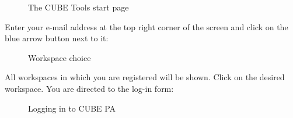 \begin{figure}[H]
\caption{The CUBE Tools start page}
\end{figure}

Enter your e-mail address at the top right corner of the screen and click on the blue arrow button next to it:

\begin{figure}[H]
\caption{Workspace choice}
\end{figure}

All workspaces in which you are registered will be shown. Click on the desired workspace. You are directed to the log-in form:

\begin{figure}[H]
\caption{Logging in to CUBE PA}
\end{figure}

